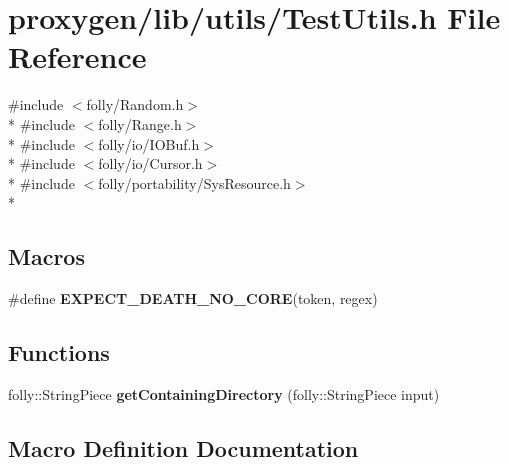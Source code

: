 \section{proxygen/lib/utils/\+Test\+Utils.h File Reference}
\label{utils_2TestUtils_8h}
{\ttfamily \#include $<$folly/\+Random.\+h$>$}\\*
{\ttfamily \#include $<$folly/\+Range.\+h$>$}\\*
{\ttfamily \#include $<$folly/io/\+I\+O\+Buf.\+h$>$}\\*
{\ttfamily \#include $<$folly/io/\+Cursor.\+h$>$}\\*
{\ttfamily \#include $<$folly/portability/\+Sys\+Resource.\+h$>$}\\*
\subsection*{Macros}
\begin{DoxyCompactItemize}
\item 
\#define {\bf E\+X\+P\+E\+C\+T\+\_\+\+D\+E\+A\+T\+H\+\_\+\+N\+O\+\_\+\+C\+O\+RE}(token,  regex)
\end{DoxyCompactItemize}
\subsection*{Functions}
\begin{DoxyCompactItemize}
\item 
folly\+::\+String\+Piece {\bf get\+Containing\+Directory} (folly\+::\+String\+Piece input)
\end{DoxyCompactItemize}


\subsection{Macro Definition Documentation}

